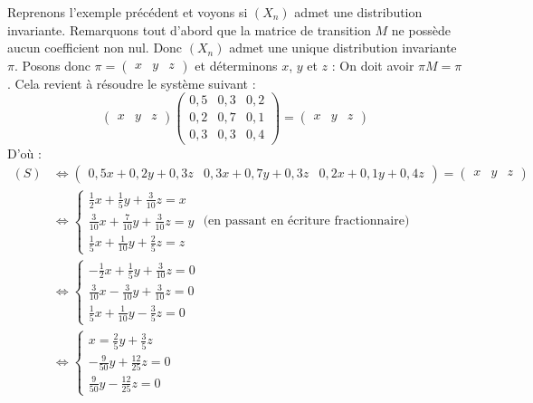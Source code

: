 	\begin{tip}[Exemple]
		Reprenons l'exemple précédent et voyons si $(X_n)$ admet une distribution invariante.
		\newpar
		Remarquons tout d'abord que la matrice de transition $M$ ne possède aucun coefficient non nul. Donc $(X_n)$ admet une unique distribution invariante $\pi$.
		\newpar
		Posons donc $\pi = \begin{pmatrix} x & y & z \end{pmatrix}$ et déterminons $x$, $y$ et $z$ :
		\newpar
		On doit avoir $\pi M = \pi$. Cela revient à résoudre le système suivant :
		\[ \begin{pmatrix} x & y & z \end{pmatrix} \begin{pmatrix} 0,5 & 0,3 & 0,2 \\ 0,2 & 0,7 & 0,1 \\ 0,3 & 0,3 & 0,4 \end{pmatrix} = \begin{pmatrix} x & y & z \end{pmatrix} \tag{S} \]
		D'où :
		\begin{align*}
			(S) &\iff \begin{pmatrix} 0,5x + 0,2y + 0,3z & 0,3x + 0,7y + 0,3z & 0,2x + 0,1y + 0,4z \end{pmatrix} = \begin{pmatrix} x & y & z \end{pmatrix} \\
			&\iff \begin{cases} \frac{1}{2}x + \frac{1}{5}y + \frac{3}{10}z = x \\ \frac{3}{10}x + \frac{7}{10}y + \frac{3}{10}z = y \\ \frac{1}{5}x + \frac{1}{10}y + \frac{2}{5}z = z \end{cases} \text{ (en passant en écriture fractionnaire)} \\
			&\iff \begin{cases} -\frac{1}{2}x + \frac{1}{5}y + \frac{3}{10}z = 0 \\ \frac{3}{10}x - \frac{3}{10}y + \frac{3}{10}z = 0 \\ \frac{1}{5}x + \frac{1}{10}y - \frac{3}{5}z = 0 \end{cases} \\
			&\iff \begin{cases} x = \frac{2}{5}y + \frac{3}{5}z \\ -\frac{9}{50}y + \frac{12}{25}z = 0 \\ \frac{9}{50}y - \frac{12}{25}z = 0 \end{cases} \\

\end{align*}
\end{tip}
